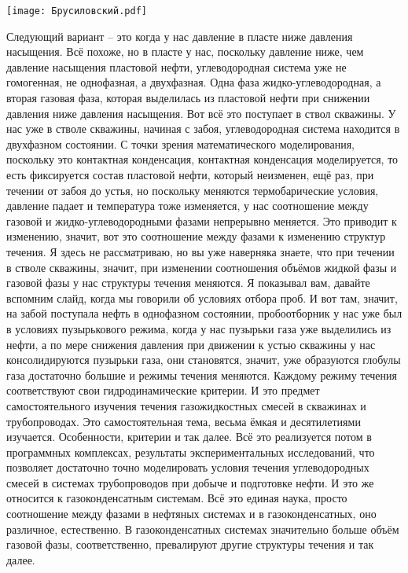 \documentclass[main.tex]{subfiles}
\begin{document}
\begin{center}
\texttt{[image: Брусиловский.pdf]}
\end{center}

Следующий вариант -- это когда у нас давление в пласте ниже давления насыщения.
Всё похоже, но в пласте у нас, поскольку давление ниже, чем давление насыщения пластовой нефти, углеводородная система уже не гомогенная, не однофазная, а двухфазная.
Одна фаза жидко-углеводородная, а вторая газовая фаза, которая выделилась из пластовой нефти при снижении давления ниже давления насыщения.
Вот всё это поступает в ствол скважины.
У нас уже в стволе скважины, начиная с забоя, углеводородная система находится в двухфазном состоянии.
С точки зрения математического моделирования, поскольку это контактная конденсация, контактная конденсация моделируется, то есть фиксируется состав пластовой нефти, который неизменен, ещё раз, при течении от забоя до устья, но поскольку меняются термобарические условия, давление падает и температура тоже изменяется, у нас соотношение между газовой и жидко-углеводородными фазами непрерывно меняется.
Это приводит к изменению, значит, вот это соотношение между фазами к изменению структур течения.
Я здесь не рассматриваю, но вы уже наверняка знаете, что при течении в стволе скважины, значит, при изменении соотношения объёмов жидкой фазы и газовой фазы у нас структуры течения меняются.
Я показывал вам, давайте вспомним слайд, когда мы говорили об условиях отбора проб.
И вот там, значит, на забой поступала нефть в однофазном состоянии, пробоотборник у нас уже был в условиях пузырькового режима, когда у нас пузырьки газа уже выделились из нефти, а по мере снижения давления при движении к устью скважины у нас консолидируются пузырьки газа, они становятся, значит, уже образуются глобулы газа достаточно большие и режимы течения меняются.
Каждому режиму течения соответствуют свои гидродинамические критерии.
И это предмет самостоятельного изучения течения газожидкостных смесей в скважинах и трубопроводах.
Это самостоятельная тема, весьма ёмкая и десятилетиями изучается.
Особенности, критерии и так далее.
Всё это реализуется потом в программных комплексах, результаты экспериментальных исследований, что позволяет достаточно точно моделировать условия течения углеводородных смесей в системах трубопроводов при добыче и подготовке нефти.
И это же относится к газоконденсатным системам.
Всё это единая наука, просто соотношение между фазами в нефтяных системах и в газоконденсатных, оно различное, естественно.
В газоконденсатных системах значительно больше объём газовой фазы, соответственно, превалируют другие структуры течения и так далее.
\end{document}
